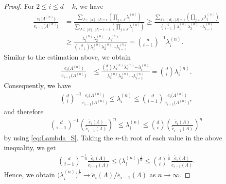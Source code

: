 \documentclass[10pt,a4paper]{article}
\numberwithin{equation}{section}
\begin{document}
\begin{proof}
For {$2\le i \le d-k$}, we have
\begin{align*}
\frac{e_{i}\big(\Lambda^{(n)}\big)}{e_{i-1}\big(\Lambda^{(n)}\big)} &= \frac{\sum_{J \subset [d],\ |J|=i} \left( \prod_{j \in J} \lambda_{j}^{(n)} \right)}{ \sum_{J \subset [d],\ |J|=i-1} \left( \prod_{j \in J} \lambda_{j}^{(n)} \right)}\ge \frac{\sum_{J \subset [d],\ |J|=i} \left( \prod_{j \in J} \lambda_{j}^{(n)} \right)}{\binom{d}{i-1} \lambda_{1}^{(n)}\lambda_{2}^{(n)}\cdots \lambda_{i-1}^{(n)}}\\
&\ge \frac{\lambda_{1}^{(n)}\lambda_{2}^{(n)}\cdots \lambda_{i}^{(n)}}{\binom{d}{i-1} \lambda_{1}^{(n)}\lambda_{2}^{(n)}\cdots \lambda_{i-1}^{(n)}}=\binom{d}{i-1}^{-1} \lambda_{i}^{(n)}.
\end{align*}
Similar to the estimation above, we obtain
\begin{align*}
\frac{e_{i}\big(\Lambda^{(n)}\big)}{e_{i-1}\big(\Lambda^{(n)}\big)}  &\le \frac{\binom{d}{i}\lambda_{1}^{(n)}\lambda_{2}^{(n)}\cdots \lambda_{i}^{(n)} }{\lambda_{1}^{(n)}\lambda_{2}^{(n)}\cdots \lambda_{i-1}^{(n)}} = \binom{d}{i} \lambda_{i}^{(n)}.
\end{align*}
Consequently, we have
\begin{align*}
\binom{d}{i}^{-1} \frac{e_i\big(\Lambda^{(n)}\big)}{e_{i-1}\big(\Lambda^{(n)}\big)} \le \lambda_{i}^{(n)} \le \binom{d}{i-1} \frac{e_i\big(\Lambda^{(n)}\big)}{e_{i-1}\big(\Lambda^{(n)}\big)},
\end{align*}
and therefore
\begin{align*}
\binom{d}{{i-1}}^{-1} \left(\frac{\widetilde{e}_i(\Lambda)}{\widetilde{e}_{i-1}(\Lambda)} \right)^n \le \lambda_{i}^{(n)} \le \binom{d}{{i}} \left(\frac{\widetilde{e}_i(\Lambda)}{\widetilde{e}_{i-1}(\Lambda)} \right)^n
\end{align*}
by using \eqref{eq:Lambda_S}.
Taking the $n$-th root of each value in the above inequality, we get
\begin{align*}
\binom{d}{{i-1}}^{-\frac{1}{n}} \frac{\widetilde{e}_i(\Lambda)}{\widetilde{e}_{i-1}(\Lambda)} \le \big(\lambda_{i}^{(n)}\big)^{\frac{1}{n}} \le \binom{d}{{i}}^{\frac{1}{n}} \frac{\widetilde{e}_i(\Lambda)}{\widetilde{e}_{i-1}(\Lambda)}.
\end{align*}
Hence, we obtain $\big(\lambda_{i}^{(n)}\big)^{\frac{1}{n}} \rightarrow   {\widetilde{e}_i(\Lambda)}/{\widetilde{e}_{i-1}(\Lambda)}$ as $n\rightarrow\infty$.
\end{proof}
\end{document}
